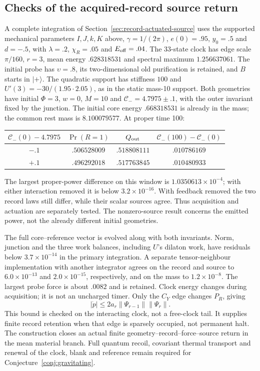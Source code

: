 \subsection{Checks of the acquired-record source return}

A complete integration of Section~\ref{sec:record-actuated-source} uses the supported mechanical parameters $I,J,k,K$ above, $\gamma=1/(2\pi)$,
$e(0)=.95$, $y_0=.5$ and $d=-.5$, with
$\lambda=.2$, $\chi_R=.05$ and $E_{\rm off}=.04$.
The 33-state clock has edge scale $\pi/160$, $r=3$, mean energy
$.628318531$ and spectral maximum $1.256637061$.
The initial probe has $\upsilon=.8$, its two-dimensional old purification
is retained, and $B$ starts in $|+\rangle$.
The quadratic support has stiffness $100$ and
$U'(3)=-30/(1.95\cdot2.05)$, as in the static mass-10 support.
Both geometries have initial $\Phi=3$, $w=0$, $M=10$ and
$\mathcal C_-=4.7975\pm.1$, with the outer invariant fixed by the junction.
The initial core energy $.668318531$ is already in the mass;
the common rest mass is $8.100079577$. At proper time 100:
\begin{center}
\begin{tabular}{cccc}
\hline
$\mathcal C_-(0)-4.7975$ & $\Pr(R=1)$ & $Q_{\rm out}$
 & $\mathcal C_-(100)-\mathcal C_-(0)$\\
\hline
$-.1$ & $.506528009$ & $.518808111$ & $.010786169$\\
$+.1$ & $.496292018$ & $.517763845$ & $.010480933$\\
\hline
\end{tabular}
\end{center}
The largest proper-power difference on this window is
$1.0350613\times10^{-4}$; with either interaction removed it is below
$3.2\times10^{-16}$. With feedback removed the two record laws still
differ, while their scalar sources agree. Thus acquisition and actuation
are separately tested. The nonzero-source result concerns the emitted
power, not the already different initial geometries.

The full core--reference vector is evolved along with both invariants.
Norm, junction and the three work balances, including $U$'s dilaton work,
have residuals below $3.7\times10^{-14}$ in the primary integration.
A separate tensor-neighbour implementation with another integrator agrees
on the record and source to $6.0\times10^{-13}$ and
$2.0\times10^{-15}$, respectively, and on the mass to $1.2\times10^{-8}$.
The largest probe force is about $.0082$ and is retained.
Clock energy changes during acquisition; it is not an uncharged timer.
Only the $C_Y$ edge changes $P_R$, giving
\[
 |\dot p|\le2a_r\|\Psi_{r-1}\|\|\Psi_r\|.
\]
This bound is checked on the interacting clock, not a free-clock tail.
It supplies finite record retention when that edge is sparsely occupied,
not permanent halt. The construction closes an actual finite
geometry--record--force--source return in the mean material branch.
Full quantum recoil, covariant thermal transport and renewal of the clock,
blank and reference remain required for Conjecture~\ref{conj:gravitating}.



